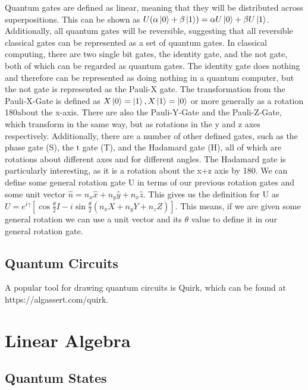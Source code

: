 \documentclass{article}
\begin{document}
Quantum gates are defined as linear, meaning that they will be distributed across superpositions. This can be shown as $U(\alpha\ket{0}+\beta\ket{1}) = \alpha U\ket{0} + \beta U\ket{1}$. Additionally, all quantum gates will be reversible, suggesting that all reversible classical gates can be represented as a set of quantum gates. In classical computing, there are two single bit gates, the identity gate, and the not gate, both of which can be regarded as quantum gates. The identity gate does nothing and therefore can be represented as doing nothing in a quantum computer, but the not gate is represented as the Pauli-X gate. The transformation from the Pauli-X-Gate is defined as $X\ket{0}=\ket{1},X\ket{1}=\ket{0}$ or more generally as a rotation 180\textdegree about the x-axis. There are also the Pauli-Y-Gate and the Pauli-Z-Gate, which transform in the same way, but as rotations in the y and z axes respectively. Additionally, there are a number of other defined gates, such as the phase gate (S), the t gate (T), and the Hadamard gate (H), all of which are rotations about different axes and for different angles. The Hadamard gate is particularly interesting, as it is a rotation about the x+z axis by 180\textdegree. We can define some general rotation gate U in terms of our previous rotation gates and some unit vector $\hat{n} = n_x\hat{x} +n_y\hat{y}+n_x\hat{z}$. This gives us the definition for U as $U=e^{i\gamma}[\cos{\frac{\theta}{2}}I-i\sin{\frac{\theta}{2}}(n_xX+n_yY+n_zZ)]$. This means, if we are given some general rotation we can use a unit vector and its $\theta$ value to define it in our general rotation gate.

\subsection{Quantum Circuits}

A popular tool for drawing quantum circuits is Quirk, which can be found at https://algassert.com/quirk. 

\section{Linear Algebra} %

\subsection{Quantum States}
\end{document}
